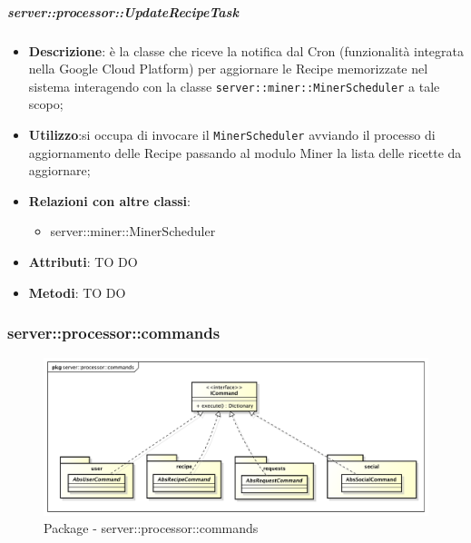     \subparagraph{server::processor::UpdateRecipeTask} %
    \label{subp:bdsm_app_server_processor_updaterecipetask}
    \begin{itemize}
      \item \textbf{Descrizione}: è la classe che riceve la notifica dal Cron (funzionalità integrata nella Google Cloud Platform) per aggiornare le Recipe memorizzate nel sistema interagendo con la classe \texttt{server::miner::MinerScheduler} a tale scopo;
      \item \textbf{Utilizzo}:si occupa di invocare il \texttt{MinerScheduler} avviando il processo di aggiornamento delle Recipe passando al modulo Miner la lista delle ricette da aggiornare;
      \item \textbf{Relazioni con altre classi}:
        \begin{itemize}
          \item server::miner::MinerScheduler
        \end{itemize}
		\item \textbf{Attributi}: TO DO
		\item \textbf{Metodi}: TO DO
    \end{itemize}


    \subsubsection{server::processor::commands} %
    \label{ssub:bdsm_app_server_processor_commands}
    \begin{figure}[!htbp]
    	\centering
    	\centerline{\includegraphics[scale=0.4]{./images/server/commands.pdf}}
    	\caption{Package - server::processor::commands}
    \end{figure}

